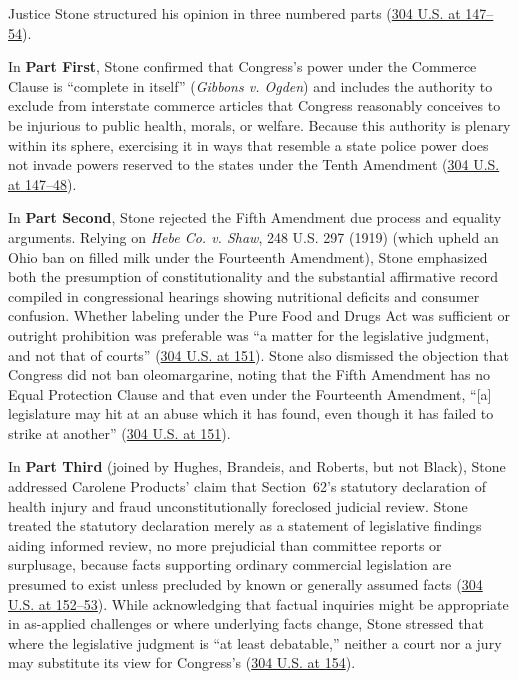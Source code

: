 \documentclass[12pt]{article}
\begin{document}
Justice Stone structured his opinion in three numbered parts (\href{https://supreme.justia.com/cases/federal/us/304/144/}{304 U.S. at 147--54}).

In \textbf{Part First}, Stone confirmed that Congress's power under the Commerce Clause is ``complete in itself'' (\textit{Gibbons v. Ogden}) and includes the authority to exclude from interstate commerce articles that Congress reasonably conceives to be injurious to public health, morals, or welfare. Because this authority is plenary within its sphere, exercising it in ways that resemble a state police power does not invade powers reserved to the states under the Tenth Amendment (\href{https://supreme.justia.com/cases/federal/us/304/144/}{304 U.S. at 147--48}).

In \textbf{Part Second}, Stone rejected the Fifth Amendment due process and equality arguments. Relying on \textit{Hebe Co. v. Shaw}, 248 U.S. 297 (1919) (which upheld an Ohio ban on filled milk under the Fourteenth Amendment), Stone emphasized both the presumption of constitutionality and the substantial affirmative record compiled in congressional hearings showing nutritional deficits and consumer confusion. Whether labeling under the Pure Food and Drugs Act was sufficient or outright prohibition was preferable was ``a matter for the legislative judgment, and not that of courts'' (\href{https://supreme.justia.com/cases/federal/us/304/144/}{304 U.S. at 151}). Stone also dismissed the objection that Congress did not ban oleomargarine, noting that the Fifth Amendment has no Equal Protection Clause and that even under the Fourteenth Amendment, ``[a] legislature may hit at an abuse which it has found, even though it has failed to strike at another'' (\href{https://supreme.justia.com/cases/federal/us/304/144/}{304 U.S. at 151}).

In \textbf{Part Third} (joined by Hughes, Brandeis, and Roberts, but not Black), Stone addressed Carolene Products' claim that Section~62's statutory declaration of health injury and fraud unconstitutionally foreclosed judicial review. Stone treated the statutory declaration merely as a statement of legislative findings aiding informed review, no more prejudicial than committee reports or surplusage, because facts supporting ordinary commercial legislation are presumed to exist unless precluded by known or generally assumed facts (\href{https://supreme.justia.com/cases/federal/us/304/144/}{304 U.S. at 152--53}). While acknowledging that factual inquiries might be appropriate in as-applied challenges or where underlying facts change, Stone stressed that where the legislative judgment is ``at least debatable,'' neither a court nor a jury may substitute its view for Congress's (\href{https://supreme.justia.com/cases/federal/us/304/144/}{304 U.S. at 154}).
\end{document}
